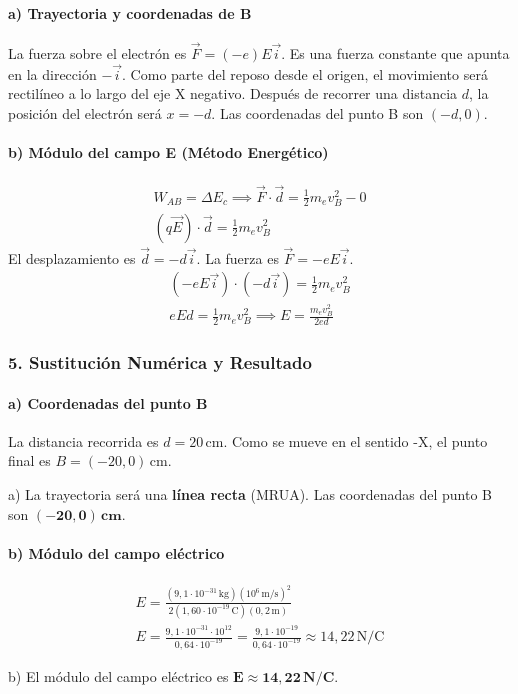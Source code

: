 \paragraph{a) Trayectoria y coordenadas de B}
La fuerza sobre el electrón es $\vec{F} = (-e)E\vec{i}$. Es una fuerza constante que apunta en la dirección $-\vec{i}$. Como parte del reposo desde el origen, el movimiento será rectilíneo a lo largo del eje X negativo.
Después de recorrer una distancia $d$, la posición del electrón será $x = -d$.
Las coordenadas del punto B son $(-d, 0)$.

\paragraph{b) Módulo del campo E (Método Energético)}
\begin{gather}
    W_{AB} = \Delta E_c \implies \vec{F} \cdot \vec{d} = \frac{1}{2}m_e v_B^2 - 0 \\
    (q\vec{E}) \cdot \vec{d} = \frac{1}{2}m_e v_B^2
\end{gather}
El desplazamiento es $\vec{d} = -d\vec{i}$. La fuerza es $\vec{F} = -eE\vec{i}$.
\begin{gather}
    (-eE\vec{i}) \cdot (-d\vec{i}) = \frac{1}{2}m_e v_B^2 \\
    eEd = \frac{1}{2}m_e v_B^2 \implies E = \frac{m_e v_B^2}{2ed}
\end{gather}

\subsubsection*{5. Sustitución Numérica y Resultado}
\paragraph{a) Coordenadas del punto B}
La distancia recorrida es $d=20\,\text{cm}$. Como se mueve en el sentido -X, el punto final es $B = (-20, 0)\,\text{cm}$.
\begin{cajaresultado}
a) La trayectoria será una \textbf{línea recta} (MRUA). Las coordenadas del punto B son $\boldsymbol{(-20, 0)\,\textbf{cm}}$.
\end{cajaresultado}

\paragraph{b) Módulo del campo eléctrico}
\begin{gather}
    E = \frac{(9,1\cdot10^{-31}\,\text{kg})(10^6\,\text{m/s})^2}{2(1,60\cdot10^{-19}\,\text{C})(0,2\,\text{m})} \\
    E = \frac{9,1\cdot10^{-31} \cdot 10^{12}}{0,64\cdot10^{-19}} = \frac{9,1\cdot10^{-19}}{0,64\cdot10^{-19}} \approx 14,22\,\text{N/C}
\end{gather}
\begin{cajaresultado}
b) El módulo del campo eléctrico es $\boldsymbol{E \approx 14,22\,\textbf{N/C}}$.
\end{cajaresultado}

